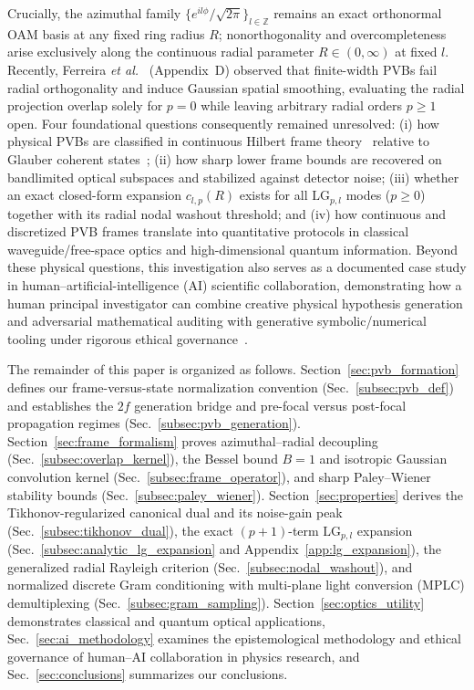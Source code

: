 \documentclass[aps,pra,reprint,amsmath,amssymb,floatfix,longbibliography]{revtex4-2}
\begin{document}
Crucially, the azimuthal family $\{e^{il\phi}/\sqrt{2\pi}\}_{l\in\mathbb{Z}}$ remains an exact orthonormal OAM basis at any fixed ring radius $R$; nonorthogonality and overcompleteness arise exclusively along the continuous radial parameter $R \in (0,\infty)$ at fixed $l$. Recently, Ferreira \emph{et al.}~\cite{Ferreira2026} (Appendix~D) observed that finite-width PVBs fail radial orthogonality and induce Gaussian spatial smoothing, evaluating the radial projection overlap solely for $p = 0$ while leaving arbitrary radial orders $p \ge 1$ open. Four foundational questions consequently remained unresolved: (i) how physical PVBs are classified in continuous Hilbert frame theory~\cite{Duffin1952,Daubechies1990,Ali1993,Christensen2016} relative to Glauber coherent states~\cite{Klauder1985,Perelomov1986,Gazeau2009}; (ii) how sharp lower frame bounds are recovered on bandlimited optical subspaces and stabilized against detector noise; (iii) whether an exact closed-form expansion $c_{l,p}(R)$ exists for all $\mathrm{LG}_{p,l}$ modes ($p \ge 0$) together with its radial nodal washout threshold; and (iv) how continuous and discretized PVB frames translate into quantitative protocols in classical waveguide/free-space optics and high-dimensional quantum information. Beyond these physical questions, this investigation also serves as a documented case study in human--artificial-intelligence (AI) scientific collaboration, demonstrating how a human principal investigator can combine creative physical hypothesis generation and adversarial mathematical auditing with generative symbolic/numerical tooling under rigorous ethical governance~\cite{Messeri2024,OToole2024,Chandra2026TheoPhysEval}.

The remainder of this paper is organized as follows. Section~\ref{sec:pvb_formation} defines our frame-versus-state normalization convention (Sec.~\ref{subsec:pvb_def}) and establishes the $2f$ generation bridge and pre-focal versus post-focal propagation regimes (Sec.~\ref{subsec:pvb_generation}). Section~\ref{sec:frame_formalism} proves azimuthal--radial decoupling (Sec.~\ref{subsec:overlap_kernel}), the Bessel bound $B=1$ and isotropic Gaussian convolution kernel (Sec.~\ref{subsec:frame_operator}), and sharp Paley--Wiener stability bounds (Sec.~\ref{subsec:paley_wiener}). Section~\ref{sec:properties} derives the Tikhonov-regularized canonical dual and its noise-gain peak (Sec.~\ref{subsec:tikhonov_dual}), the exact $(p+1)$-term $\mathrm{LG}_{p,l}$ expansion (Sec.~\ref{subsec:analytic_lg_expansion} and Appendix~\ref{app:lg_expansion}), the generalized radial Rayleigh criterion (Sec.~\ref{subsec:nodal_washout}), and normalized discrete Gram conditioning with multi-plane light conversion (MPLC) demultiplexing (Sec.~\ref{subsec:gram_sampling}). Section~\ref{sec:optics_utility} demonstrates classical and quantum optical applications, Sec.~\ref{sec:ai_methodology} examines the epistemological methodology and ethical governance of human--AI collaboration in physics research, and Sec.~\ref{sec:conclusions} summarizes our conclusions.
\end{document}
